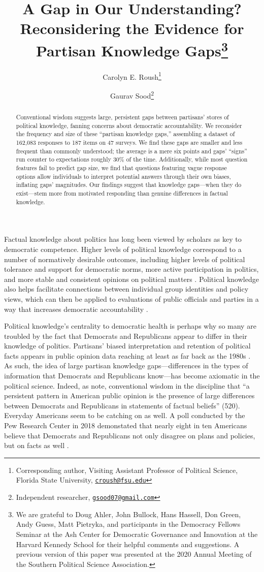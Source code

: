 \documentclass[12pt, letterpaper]{article}
\title{A Gap in Our Understanding? Reconsidering the Evidence for Partisan Knowledge Gaps\footnote{We are grateful to Doug Ahler, John Bullock, Hans Hassell, Don Green, Andy Guess, Matt Pietryka, and participants in the Democracy Fellows Seminar at the Ash Center for Democratic Governance and Innovation at the Harvard Kennedy School for their helpful comments and suggestions. A previous version of this paper was presented at the 2020 Annual Meeting of the Southern Political Science Association.}}
\author{Carolyn E. Roush\thanks{Corresponding author, Visiting Assistant Professor of Political Science, Florida State University, \href{mailto:croush@fsu.edu}{\texttt{croush@fsu.edu}}} \and Gaurav Sood\thanks{Independent researcher, \href{mailto:gsood07@gmail.com}{\texttt{gsood07@gmail.com}}}}
\begin{document}
\maketitle
\thispagestyle{empty}

\begin{abstract}

\noindent Conventional wisdom suggests large, persistent gaps between partisans' stores of political knowledge, fanning concerns about democratic accountability. We reconsider the frequency and size of these ``partisan knowledge gaps,'' assembling a dataset of 162,083 responses to 187 items on 47 surveys. We find these gaps are smaller and less frequent than commonly understood; the average is a mere six points and gaps' ``signs'' run counter to expectations roughly 30\% of the time. Additionally, while most question features fail to predict gap size, we find that questions featuring vague response options allow individuals to interpret potential answers through their own biases, inflating gaps' magnitudes. Our findings suggest that knowledge gaps---when they do exist---stem more from motivated responding than genuine differences in factual knowledge.

\end{abstract}

\vspace{.2in}

\newpage

\doublespacing

Factual knowledge about politics has long been viewed by scholars as key to democratic competence. Higher levels of political knowledge correspond to a number of normatively desirable outcomes, including higher levels of political tolerance and support for democratic norms, more active participation in politics, and more stable and consistent opinions on political matters \citep{Converse1964,dellicarpini,galston_2001}. Political knowledge also helps facilitate connections between individual group identities and policy views, which can then be applied to evaluations of public officials and parties in a way that increases democratic accountability \citep{dellicarpini}.

Political knowledge's centrality to democratic health is perhaps why so many are troubled by the fact that Democrats and Republicans appear to differ in their knowledge of politics. Partisans' biased interpretation and retention of political facts appears in public opinion data reaching at least as far back as the 1980s \citep[e.g.,][]{bartels_2002,jerit2012partisan}. As such, the idea of large partisan knowledge gaps---differences in the types of information that Democrats and Republicans know---has become axiomatic in the political science. Indeed, as \citet{bullocketal_2015} note, conventional wisdom in the discipline that ``a persistent pattern in American public opinion is the presence of large differences between Democrats and Republicans in statements of factual beliefs'' (520). Everyday Americans seem to be catching on as well. A poll conducted by the Pew Research Center in 2018 demonstated that nearly eight in ten Americans believe that Democrats and Republicans not only disagree on plans and policies, but on facts as well \citep{pew2018disagree}. 
\end{document}
